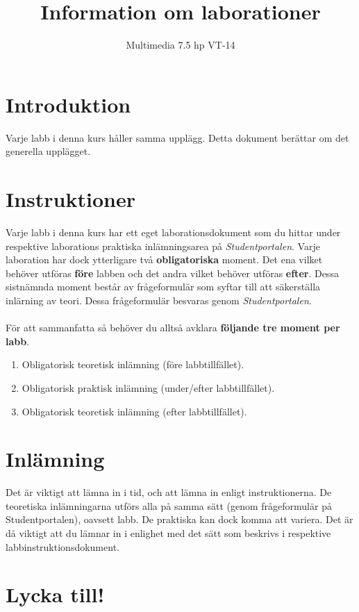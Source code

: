 \documentclass[12pt]{article}
\date{}
\title{ Information om laborationer }
\author{ Multimedia 7.5 hp VT-14 }
\begin{document}
\maketitle
\vspace{-2em}



\section{Introduktion}
Varje labb i denna kurs håller samma upplägg. Detta dokument berättar om det generella upplägget.

\section{Instruktioner}
Varje labb i denna kurs har ett eget laborationsdokument som du hittar under respektive laborations praktiska inlämningsarea på \emph{Studentportalen}. Varje laboration har dock ytterligare två \textbf{obligatoriska} moment. Det ena vilket behöver utföras \textbf{före} labben och det andra vilket behöver utföras \textbf{efter}. Dessa sistnämnda moment består av frågeformulär som syftar till att säkerställa inlärning av teori. Dessa frågeformulär besvaras genom \emph{Studentportalen}.

  \paragraph{}
  För att sammanfatta så behöver du alltså avklara \textbf{följande tre moment per labb}.

  \begin{enumerate}
    \item Obligatorisk teoretisk inlämning (före labbtillfället).
    \item Obligatorisk praktisk inlämning (under/efter labbtillfället).
    \item Obligatorisk teoretisk inlämning (efter labbtillfället).
  \end{enumerate}

\section{Inlämning}
Det är viktigt att lämna in i tid, och att lämna in enligt instruktionerna. De teoretiska inlämningarna utförs alla på samma sätt (genom frågeformulär på Studentportalen), oavsett labb. De praktiska kan dock komma att variera. Det är då viktigt att du lämnar in i enlighet med det sätt som beskrivs i respektive labbinstruktionsdokument.

\section{Lycka till!}
\end{document}

